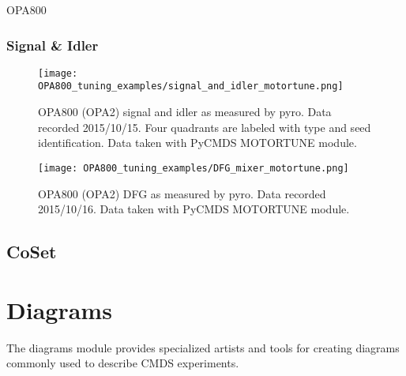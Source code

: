 \documentclass[11pt]{article}
\begin{document}
OPA800 

\subsubsection{Signal \& Idler}

\begin{figure}
	\begin{centering}
		\texttt{[image: OPA800\_tuning\_examples/signal\_and\_idler\_motortune.png]}
		\caption{OPA800 (OPA2) signal and idler as measured by pyro. Data recorded 2015/10/15. Four quadrants are labeled with type and seed identification. Data taken with PyCMDS MOTORTUNE module.}
	\end{centering}
	\label{fig:opa800 signal and idler}
\end{figure}

\begin{figure}
	\begin{centering}
		\texttt{[image: OPA800\_tuning\_examples/DFG\_mixer\_motortune.png]}
		\caption{OPA800 (OPA2) DFG as measured by pyro. Data recorded 2015/10/16. Data taken with PyCMDS MOTORTUNE module.}
	\end{centering}
	\label{fig:opa800 DFG}
\end{figure}

\subsection{CoSet}

\pagebreak
\section{Diagrams}

The diagrams module provides specialized artists and tools for creating diagrams commonly used to describe CMDS experiments.

\printbibliography
\end{document}
